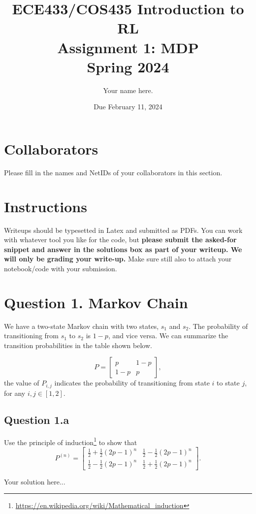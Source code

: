 \documentclass[12pt]{article}
\date{Due February 11, 2024}
\author{\begin{fillme}[width=0.3\textwidth]
 Your name here.
\end{fillme}} %
\title{ECE433/COS435 Introduction to RL\\
  Assignment 1: MDP\\
  Spring 2024\\
}
\begin{document}
  \maketitle
  \section*{Collaborators}
\begin{fillme}
 Please fill in the names and NetIDs of your collaborators in this section.
\end{fillme}

\section*{Instructions}

Writeups should be typesetted in Latex and submitted as PDFs. You can work with whatever tool you like for the code, but \textbf{please submit the asked-for snippet and answer in the solutions box as part of your writeup. We will only be grading your write-up.} Make sure still also to attach your notebook/code with your submission.

\section*{Question 1. Markov Chain}
We have a two-state Markov chain with two states, $s_1$ and $s_2$. The probability of transitioning from $s_1$ to $s_2$ is $1-p$, and vice versa. We can summarize the transition probabilities in the table shown below.

\[
P = \begin{bmatrix}
p & 1 - p \\
1 - p & p 
\end{bmatrix},
\]
the value of $P_{i,j}$ indicates the probability of transitioning from state $i$ to state $j$, for any $i,j \in [1,2]$.

 \subsection*{Question 1.a} Use the principle of induction\footnote{\url{https://en.wikipedia.org/wiki/Mathematical_induction}} to show that
\[
P^{(n)} = \begin{bmatrix}
\frac{1}{2} + \frac{1}{2}(2p - 1)^n & \frac{1}{2} - \frac{1}{2}(2p - 1)^n \\
\frac{1}{2} - \frac{1}{2}(2p - 1)^n & \frac{1}{2} + \frac{1}{2}(2p - 1)^n
\end{bmatrix}.
\]
\begin{solution}
Your solution here...
\end{solution}
\end{document}
